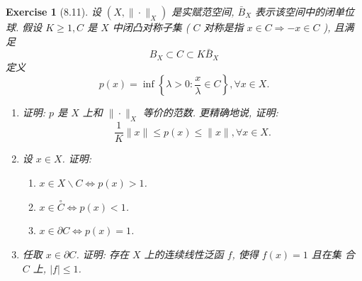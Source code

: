 \documentclass[hyperref,UTF8]{ctexart}
\newtheorem{ex}{Exercise}[section]
\begin{document}
\begin{ex}[8.11]
    设 $\left(X,\|\cdot\|_{X}\right)$ 是实赋范空间, $\bar{B}_{X}$ 表示该空间中的闭单位球. 假设 $K \geqslant 1, C$ 是 $X$ 中闭凸对称子集 ( $C$ 对称是指 $x \in C \Longrightarrow-x \in C$ ), 且满足
$$
B_{X} \subset C \subset K \bar{B}_{X}
$$
定义
$$
p(x)=\inf \left\{\lambda>0: \frac{x}{\lambda} \in C\right\}, \forall x \in X .
$$
\begin{enumerate}
    \item 证明: $p$ 是 $X$ 上和 $\|\cdot\|_{X}$ 等价的范数. 更精确地说, 证明:
    $$
    \frac{1}{K}\|x\| \leqslant p(x) \leqslant\|x\|, \forall x \in X .
    $$
    \item 设 $x \in X$. 证明:\begin{enumerate}
        \item $x \in X \backslash C \Longleftrightarrow p(x)>1$.
        \item $x \in \stackrel{\circ}{C} \Longleftrightarrow p(x)<1$.
        \item $x \in \partial C \Longleftrightarrow p(x)=1$.
    \end{enumerate}
    \item 任取 $x \in \partial C$. 证明: 存在 $X$ 上的连续线性泛函 $f$, 使得 $f(x)=1$ 且在集 合 $C$ 上, $|f| \leqslant 1$.
\end{enumerate}
\end{ex}
\end{document}
